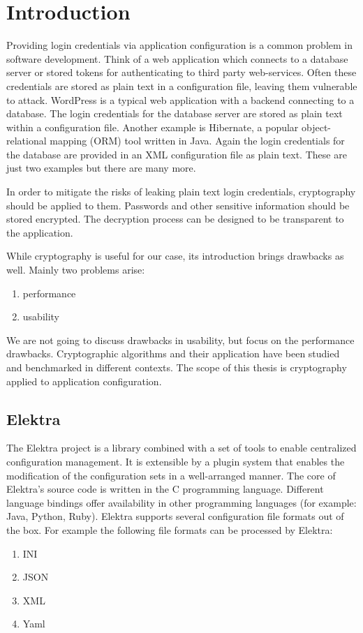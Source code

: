 \chapter{Introduction}

Providing login credentials via application configuration is a common problem in software development.
Think of a web application which connects to a database server or stored tokens for authenticating to third party web-services.
Often these credentials are stored as plain text in a configuration file, leaving them vulnerable to attack.
WordPress is a typical web application with a backend connecting to a database.
The login credentials for the database server are stored as plain text within a configuration file.\cite{wordpress-doc}
Another example is Hibernate, a popular object-relational mapping (ORM) tool written in Java.
Again the login credentials for the database are provided in an XML configuration file as plain text.\cite{hibernate-doc}
These are just two examples but there are many more.

In order to mitigate the risks of leaking plain text login credentials, cryptography should be applied to them.
Passwords and other sensitive information should be stored encrypted.
The decryption process can be designed to be transparent to the application.

While cryptography is useful for our case, its introduction brings drawbacks as well.
Mainly two problems arise:
\begin{enumerate}
\item performance
\item usability
\end{enumerate}

We are not going to discuss drawbacks in usability, but focus on the performance drawbacks.
Cryptographic algorithms and their application have been studied and benchmarked in different contexts.\cite{thakur2011aes,ocf,freebsdtls}
The scope of this thesis is cryptography applied to application configuration.

\section{Elektra}

The Elektra project is a library combined with a set of tools to enable centralized configuration management.
It is extensible by a plugin system that enables the modification of the configuration sets in a well-arranged manner.
The core of Elektra's source code is written in the C programming language.
Different language bindings offer availability in other programming languages (for example: Java, Python, Ruby).
Elektra supports several configuration file formats out of the box.
For example the following file formats can be processed by Elektra:\cite{raab2010thesis,elektra-doc}
\begin{enumerate}
\item INI
\item JSON
\item XML
\item Yaml
\end{enumerate}

